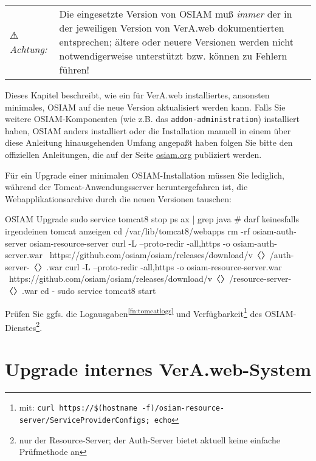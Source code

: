 \documentclass{tarentanleitung}
\newcommand{\vwiaversosiam}{2.5}
\begin{document}
\begin{tabu}{@{}l@{ }X@{}}
⚠ \emph{Achtung:} & Die eingesetzte Version von OSIAM muß \emph{immer} der
in der jeweiligen Version von VerA.web dokumentierten entsprechen; ältere
oder neuere Versionen werden nicht notwendigerweise unterstützt bzw. können
zu Fehlern führen!
\end{tabu}

Dieses Kapitel beschreibt, wie ein für VerA.web installiertes,
ansonsten minimales, OSIAM auf die neue Version aktualisiert
werden kann. Falls Sie weitere OSIAM-Komponenten (wie z.B.
das \texttt{addon-administration}) installiert haben, OSIAM
anders installiert oder die Installation manuell in einem
über diese Anleitung hinausgehenden Umfang angepaßt haben
folgen Sie bitte den offiziellen Anleitungen, die auf der
Seite \href{http://osiam.org/}{osiam.org} publiziert werden.

\begin{minipage}{\linewidth}
Für ein Upgrade einer minimalen OSIAM-Installation müssen Sie
lediglich, während der Tomcat-Anwendungsserver heruntergefahren
ist, die Webapplikationsarchive durch die neuen Versionen tauschen:

\begin{lstdump}{OSIAM Upgrade}
sudo service tomcat8 stop
ps ax | grep java               # darf keinesfalls irgendeinen tomcat anzeigen
cd /var/lib/tomcat8/webapps
rm -rf osiam-auth-server osiam-resource-server
curl -L --proto-redir -all,https -o osiam-auth-server.war \
    https://github.com/osiam/osiam/releases/download/v〈\lstdumpesc{\vwiaversosiam}〉/auth-server-〈\lstdumpesc{\vwiaversosiam}〉.war
curl -L --proto-redir -all,https -o osiam-resource-server.war \
    https://github.com/osiam/osiam/releases/download/v〈\lstdumpesc{\vwiaversosiam}〉/resource-server-〈\lstdumpesc{\vwiaversosiam}〉.war
cd -
sudo service tomcat8 start
\end{lstdump}
\end{minipage}

Prüfen Sie ggfs. die Logausgaben\Hair\textsuperscript{\ref{fn:tomcatlogs}}
und Verfügbarkeit\Hair\footnote{\label{fn:osiamcheck}mit:
\texttt{curl https://\$(hostname -f)/osiam-resource-server/ServiceProviderConfigs; echo}%
} des OSIAM-Dienstes\Hair\footnote{\label{fn:osiamsvcchk}nur der
Resource-Server; der Auth-Server bietet aktuell keine einfache Prüfmethode an}.

\section{Upgrade internes VerA.web-System}\label{sec:upgrade-int}
\end{document}
